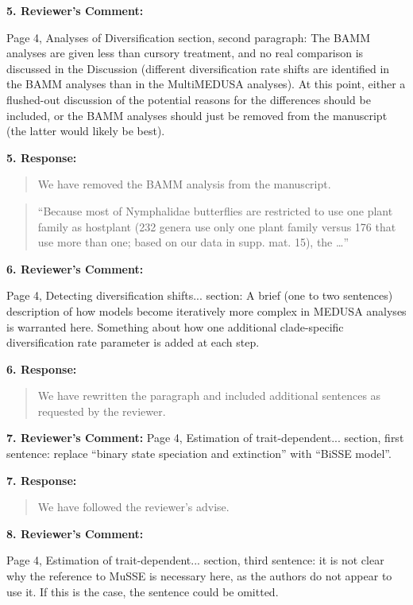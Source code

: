 \documentclass[]{article}
\begin{document}
\textbf{5. Reviewer's Comment:}

Page 4, Analyses of Diversification section, second paragraph: The BAMM analyses are given less
than cursory treatment, and no real comparison is discussed in the Discussion (different
diversification rate shifts are identified in the BAMM analyses than in the MultiMEDUSA
analyses). At this point, either a flushed-out discussion of the potential reasons for the differences
should be included, or the BAMM analyses should just be removed from the manuscript (the latter
would likely be best).


\textbf{5. Response:}

\begin{quote}
\color{blue}
We have removed the BAMM analysis from the manuscript.
\end{quote}

\begin{quote}
\color{blue}
``Because most of Nymphalidae butterflies are restricted to use one
plant family as hostplant (232 genera use only one plant family versus
176 that use more than one; based on our data in supp. mat. 15), the
\ldots{}''
\end{quote}

\textbf{6. Reviewer's Comment:}

Page 4, Detecting diversification shifts... section: A brief (one to two sentences) description of how
models become iteratively more complex in MEDUSA analyses is warranted here. Something
about how one additional clade-specific diversification rate parameter is added at each step.


\textbf{6. Response:}

\begin{quote}
\color{blue}
We have rewritten the paragraph and included additional sentences as requested
by the reviewer.
\end{quote}


\textbf{7. Reviewer's Comment:}
Page 4, Estimation of trait-dependent... section, first sentence: replace “binary state speciation and extinction” with “BiSSE model”.

\textbf{7. Response:}

\begin{quote}
\color{blue}
We have followed the reviewer's advise.
\end{quote}

\textbf{8. Reviewer's Comment:}

 Page 4, Estimation of trait-dependent... section, third sentence: it is not clear why the reference to MuSSE is necessary here, as the authors do not appear to use it. If this is the case, the sentence could be omitted.
 
\end{document}
